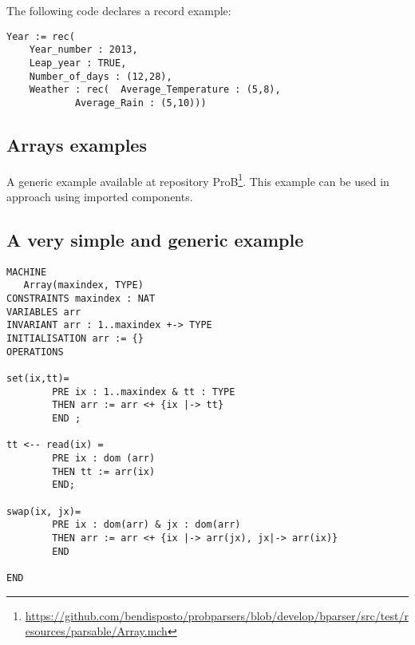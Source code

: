\documentclass[10pt,a4paper]{article}
\begin{document}
The following code declares a record example:

\begin{verbatim}
Year := rec(
	Year_number : 2013,
	Leap_year : TRUE,
	Number_of_days : (12,28),
	Weather : rec(  Average_Temperature : (5,8),
			Average_Rain : (5,10)))
\end{verbatim}





\subsection{Arrays examples}

A generic example available at repository ProB\footnote{
\url{https://github.com/bendisposto/probparsers/blob/develop/bparser/src/test/resources/parsable/Array.mch}}. 
This example can be used in approach using imported components.

\subsection{A very simple and generic example}


\begin{verbatim}
MACHINE
   Array(maxindex, TYPE)
CONSTRAINTS maxindex : NAT
VARIABLES arr
INVARIANT arr : 1..maxindex +-> TYPE
INITIALISATION arr := {}
OPERATIONS 

set(ix,tt)=
        PRE ix : 1..maxindex & tt : TYPE
        THEN arr := arr <+ {ix |-> tt}
        END ;

tt <-- read(ix) =
        PRE ix : dom (arr)
        THEN tt := arr(ix)
        END;

swap(ix, jx)=
        PRE ix : dom(arr) & jx : dom(arr)
        THEN arr := arr <+ {ix |-> arr(jx), jx|-> arr(ix)}
        END

END
\end{verbatim}
\end{document}

